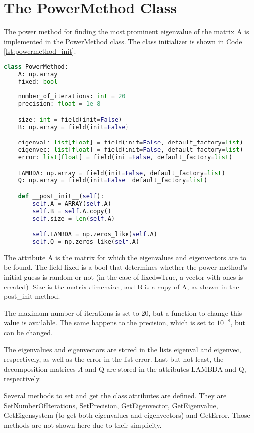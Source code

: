 \section{The PowerMethod Class} \label{sec:powermethod}
The power method for finding the most prominent eigenvalue of the matrix A is implemented in the PowerMethod class. The class initializer is shown in Code \ref{lst:powermethod_init}. 
\begin{lstlisting}[caption={PowerMethod class initializer}, label={lst:powermethod_init}, language=python]
class PowerMethod:
    A: np.array
    fixed: bool
    
    number_of_iterations: int = 20
    precision: float = 1e-8

    size: int = field(init=False)
    B: np.array = field(init=False)

    eigenval: list[float] = field(init=False, default_factory=list)
    eigenvec: list[float] = field(init=False, default_factory=list)
    error: list[float] = field(init=False, default_factory=list)

    LAMBDA: np.array = field(init=False, default_factory=list)
    Q: np.array = field(init=False, default_factory=list)

    def __post_init__(self):
        self.A = ARRAY(self.A)
        self.B = self.A.copy()
        self.size = len(self.A)

        self.LAMBDA = np.zeros_like(self.A)
        self.Q = np.zeros_like(self.A)
\end{lstlisting}

The attribute A is the matrix for which the eigenvalues and eigenvectors are to be found. The field fixed is a bool that determines whether the power method's initial guess is random or not (in the case of fixed=True, a vector with ones is created). Size is the matrix dimension, and B is a copy of A, as shown in the post\_init method. 

The maximum number of iterations is set to 20, but a function to change this value is available. The same happens to the precision, which is set to $10^{-8}$, but can be changed.

The eigenvalues and eigenvectors are stored in the lists eigenval and eigenvec, respectively, as well as the error in the list error. Last but not least, the decomposition matrices $\Lambda$ and Q are stored in the attributes LAMBDA and Q, respectively.

Several methods to set and get the class attributes are defined. They are SetNumberOfIterations, SetPrecision, GetEigenvector, GetEigenvalue, GetEigensystem (to get both eigenvalues and eigenvectors) and GetError. Those methods are not shown here due to their simplicity. 


